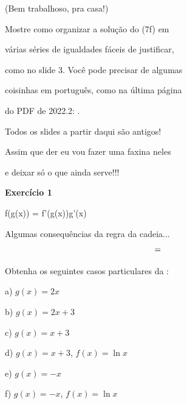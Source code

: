\documentclass[oneside,12pt]{article}
\begin{document}
{{(Bem trabalhoso, pra casa!)

Mostre como organizar a solução do (7f) em

várias séries de igualdades fáceis de justificar,

como no slide 3. Você pode precisar de algumas

coisinhas em português, como na última página

do PDF de 2022.2: .





%




}}



\newpage

 Todos os slides a partir daqui são antigos!

Assim que der eu vou fazer uma faxina neles

e deixar só o que ainda serve!!!





\newpage


{\bf Exercício 1}

 {\ddx f(g(x)) = f'(g(x))g'(x)}

Algumas consequências da regra da cadeia...
%
$$\ga{[RC]} \;=\; \ga{(RC)}$$

Obtenha os seguintes casos particulares da \ga{[RC]}:

\msk

a) $g(x) = 2x$

b) $g(x) = 2x+3$

c) $g(x) = x+3$

d) $g(x) = x+3$, $f(x)=\ln x$

e) $g(x) = -x$

f) $g(x) = -x$, $f(x) = \ln x$
\end{document}
